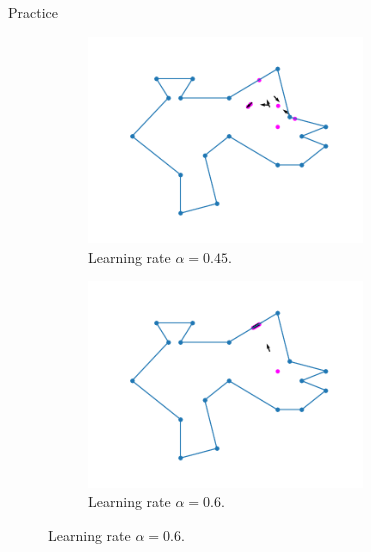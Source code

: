 \documentclass{beamer}
\begin{document}
\begin{frame}{Practice}
\begin{figure}[h!]
\begin{subfigure}{0.45\textwidth}
			\includegraphics[width = 0.8\textwidth]{Images/random_gradient_045.png}
			\caption{Learning rate $\alpha = 0.45$.}
			\label{fig:random_gradient_045}
		\end{subfigure}
		\begin{subfigure}{0.45\textwidth}
			\centering
			\includegraphics[width = 0.8\textwidth]{Images/random_gradient_06.png}
			\caption{Learning rate $\alpha = 0.6$.}
			\label{fig:random_gradient_06}
		\end{subfigure}
		\label{fig:multiple_gradients}
	\end{figure}
\end{frame}
\end{document}
